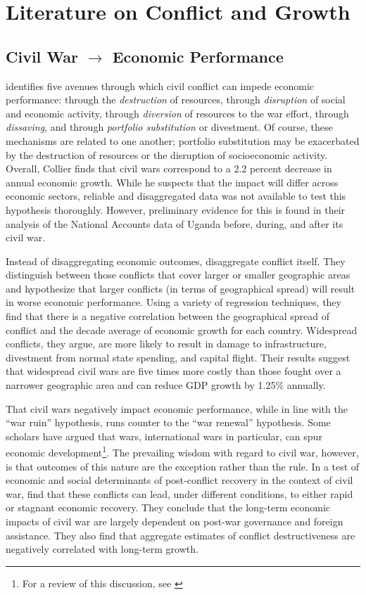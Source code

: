 
\section{Literature on Conflict and Growth}
\label{lit}

\subsection{Civil War $\rightarrow$ Economic Performance}

\citet{collier:1999} identifies five avenues through which civil conflict can impede economic performance: through the \textit{destruction} of resources, through \textit{disruption} of social and economic activity, through \textit{diversion} of resources to the war effort, through \textit{dissaving}, and through \textit{portfolio substitution} or divestment. Of course, these mechanisms are related to one another; portfolio substitution may be exacerbated by the destruction of resources or the disruption of socioeconomic activity. Overall, Collier finds that civil wars correspond to a 2.2 percent decrease in annual economic growth. While he suspects that the impact will differ across economic sectors, reliable and disaggregated data was not available to test this hypothesis thoroughly. However, preliminary evidence for this is found in their analysis of the National Accounts data of Uganda before, during, and after its civil war.

Instead of disaggregating economic outcomes, \citet{imai:weinstein:2000} disaggregate conflict itself. They distinguish between those conflicts that cover larger or smaller geographic areas and hypothesize that larger conflicts (in terms of geographical spread) will result in worse economic performance. Using a variety of regression techniques, they find that there is a negative correlation between the geographical spread of conflict and the decade average of economic growth for each country. Widespread conflicts, they argue, are more likely to result in damage to infrastructure, divestment from normal state spending, and capital flight. Their results suggest that widespread civil wars are five times more costly than those fought over a narrower geographic area and can reduce GDP growth by 1.25\% annually.

That civil wars negatively impact economic performance, while in line with the ``war ruin'' hypothesis, runs counter to the ``war renewal'' hypothesis. Some scholars have argued that wars, international wars in particular, can spur economic development\footnote{For a review of this discussion, see \citet{rasler:thompson:1985}}. The prevailing wisdom with regard to civil war, however, is that outcomes of this nature are the exception rather than the rule. In a test of economic and social determinants of post-conflict recovery in the context of civil war, \citet{kang:meernik:2005} find that these conflicts can lead, under different conditions, to either rapid or stagnant economic recovery. They conclude that the long-term economic impacts of civil war are largely dependent on post-war governance and foreign assistance. They also find that aggregate estimates of conflict destructiveness are negatively correlated with long-term growth.

